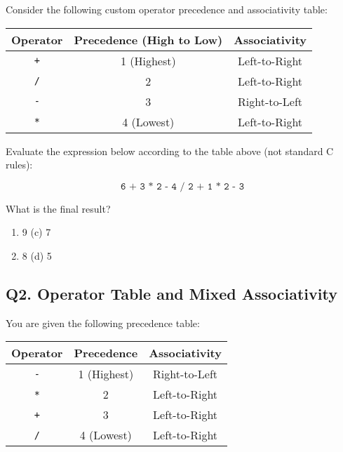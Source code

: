 Consider the following custom operator precedence and associativity table:

\begin{table}[H]
\centering
\begin{tabular}{|c|c|c|}
\hline
\textbf{Operator} & \textbf{Precedence (High to Low)} & \textbf{Associativity} \\
\hline
\texttt{+} & 1 (Highest) & Left-to-Right \\
\texttt{/} & 2 & Left-to-Right \\
\texttt{-} & 3 & Right-to-Left \\
\texttt{*} & 4 (Lowest) & Left-to-Right \\
\hline
\end{tabular}
\end{table}

Evaluate the expression below according to the table above (not standard C rules):

\[
\texttt{6 + 3 * 2 - 4 / 2 + 1 * 2 - 3}
\]

What is the final result?

\begin{enumerate}[label=(\alph*)]
    \item 9 \hspace{5cm} (c) 7
    \item 8 \hspace{5cm} (d) 5
\end{enumerate}

\vspace{1em}
\subsection*{Q2. Operator Table and Mixed Associativity}

You are given the following precedence table:

\begin{table}[H]
\centering
\begin{tabular}{|c|c|c|}
\hline
\textbf{Operator} & \textbf{Precedence} & \textbf{Associativity} \\
\hline
\texttt{-} & 1 (Highest) & Right-to-Left \\
\texttt{*} & 2 & Left-to-Right \\
\texttt{+} & 3 & Left-to-Right \\
\texttt{/} & 4 (Lowest) & Left-to-Right \\
\hline
\end{tabular}
\end{table}

